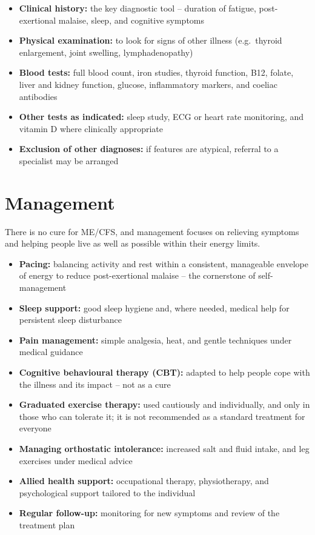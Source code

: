 \begin{itemize}
    \item \textbf{Clinical history:} the key diagnostic tool -- duration of fatigue, post-exertional malaise, sleep, and cognitive symptoms
    \item \textbf{Physical examination:} to look for signs of other illness (e.g.\ thyroid enlargement, joint swelling, lymphadenopathy)
    \item \textbf{Blood tests:} full blood count, iron studies, thyroid function, B12, folate, liver and kidney function, glucose, inflammatory markers, and coeliac antibodies
    \item \textbf{Other tests as indicated:} sleep study, ECG or heart rate monitoring, and vitamin D where clinically appropriate
    \item \textbf{Exclusion of other diagnoses:} if features are atypical, referral to a specialist may be arranged
\end{itemize}

\section*{Management}
There is no cure for ME/CFS, and management focuses on relieving symptoms and helping people live as well as possible within their energy limits.

\begin{itemize}
    \item \textbf{Pacing:} balancing activity and rest within a consistent, manageable envelope of energy to reduce post-exertional malaise -- the cornerstone of self-management
    \item \textbf{Sleep support:} good sleep hygiene and, where needed, medical help for persistent sleep disturbance
    \item \textbf{Pain management:} simple analgesia, heat, and gentle techniques under medical guidance
    \item \textbf{Cognitive behavioural therapy (CBT):} adapted to help people cope with the illness and its impact -- not as a cure
    \item \textbf{Graduated exercise therapy:} used cautiously and individually, and only in those who can tolerate it; it is not recommended as a standard treatment for everyone
    \item \textbf{Managing orthostatic intolerance:} increased salt and fluid intake, and leg exercises under medical advice
    \item \textbf{Allied health support:} occupational therapy, physiotherapy, and psychological support tailored to the individual
    \item \textbf{Regular follow-up:} monitoring for new symptoms and review of the treatment plan
\end{itemize}

